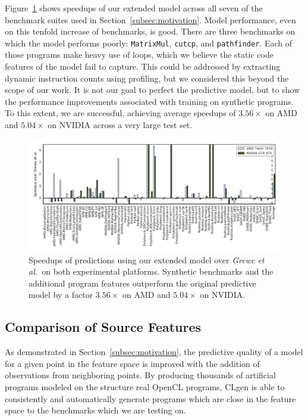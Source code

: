 Figure~\ref{fig:ex2} shows speedups of our extended model across all seven of the benchmark suites used in Section~\ref{subsec:motivation}. Model performance, even on this tenfold increase of benchmarks, is good. There are three benchmarks on which the model performs poorly: \texttt{MatrixMul}, \texttt{cutcp}, and \texttt{pathfinder}. Each of those programs make heavy use of loops, which we believe the static code features of the model fail to capture. This could be addressed by extracting dynamic instruction counts using profiling, but we considered this beyond the scope of our work. It is not our goal to perfect the predictive model, but to show the performance improvements associated with training on synthetic programs. To this extent, we are successful, achieving average speedups of $3.56\times$ on AMD and $5.04\times$ on NVIDIA across a very large test set.

\begin{figure}[t]
  \centering%
  \includegraphics[width=1\textwidth]{img/ex2}%
  \caption{Speedups of predictions using our extended model over \emph{Grewe et al.\ }on both experimental platforms. Synthetic benchmarks and the additional program features outperform the original predictive model by a factor $3.56\times$ on AMD and $5.04\times$ on NVIDIA.}%
  \label{fig:ex2}
\end{figure}

\subsection{Comparison of Source Features}%
\label{subsec:eval-features}

As demonstrated in Section~\ref{subsec:motivation}, the predictive quality of a model for a given point in the feature space is improved with the addition of observations from neighboring points. By producing thousands of artificial programs modeled on the structure real OpenCL programs, CLgen is able to consistently and automatically generate programs which are close in the feature space to the benchmarks which we are testing on.

